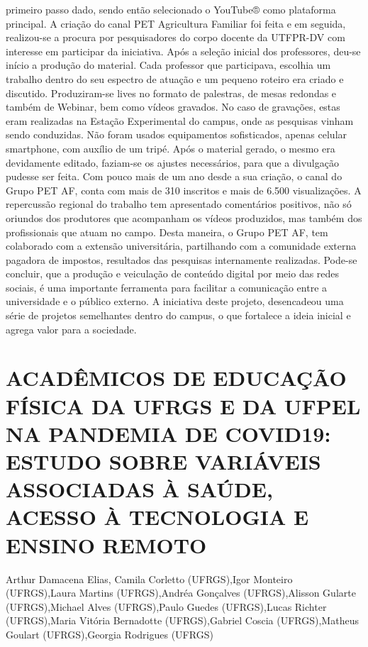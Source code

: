 primeiro passo dado, sendo então selecionado o YouTube® como plataforma principal. A criação 
do canal PET Agricultura Familiar foi feita e em seguida, realizou-se a procura por 
pesquisadores do corpo docente da UTFPR-DV com interesse em participar da iniciativa. Após a 
seleção inicial dos professores, deu-se início a produção do material. 
Cada professor que participava, escolhia um trabalho dentro do seu espectro de atuação e 
um pequeno roteiro era criado e discutido. Produziram-se lives no formato de palestras, de mesas 
redondas e também de Webinar, bem como vídeos gravados. No caso de gravações, estas eram
realizadas na Estação Experimental do campus, onde as pesquisas vinham sendo conduzidas. Não 
foram usados equipamentos sofisticados, apenas celular smartphone, com auxílio de um tripé.
Após o material gerado, o mesmo era devidamente editado, faziam-se os ajustes 
necessários, para que a divulgação pudesse ser feita.
Com pouco mais de um ano desde a sua criação, o canal do Grupo PET AF, conta com 
mais de 310 inscritos e mais de 6.500 visualizações. A repercussão regional do trabalho tem
apresentado comentários positivos, não só oriundos dos produtores que acompanham os vídeos 
produzidos, mas também dos profissionais que atuam no campo. Desta maneira, o Grupo PET AF, 
tem colaborado com a extensão universitária, partilhando com a comunidade externa pagadora de 
impostos, resultados das pesquisas internamente realizadas.
Pode-se concluir, que a produção e veiculação de conteúdo digital por meio das redes 
sociais, é uma importante ferramenta para facilitar a comunicação entre a universidade e o público 
externo. A iniciativa deste projeto, desencadeou uma série de projetos semelhantes dentro do 
campus, o que fortalece a ideia inicial e agrega valor para a sociedade.



\section{ACADÊMICOS DE EDUCAÇÃO FÍSICA DA UFRGS E DA UFPEL NA PANDEMIA DE COVID19: ESTUDO SOBRE VARIÁVEIS ASSOCIADAS À SAÚDE, ACESSO À TECNOLOGIA E ENSINO REMOTO }

Arthur Damacena Elias, Camila Corletto (UFRGS),Igor Monteiro (UFRGS),Laura Martins (UFRGS),Andréa Gonçalves (UFRGS),Alisson Gularte (UFRGS),Michael Alves (UFRGS),Paulo Guedes (UFRGS),Lucas Richter (UFRGS),Maria Vitória Bernadotte (UFRGS),Gabriel Coscia (UFRGS),Matheus Goulart (UFRGS),Georgia Rodrigues (UFRGS)


